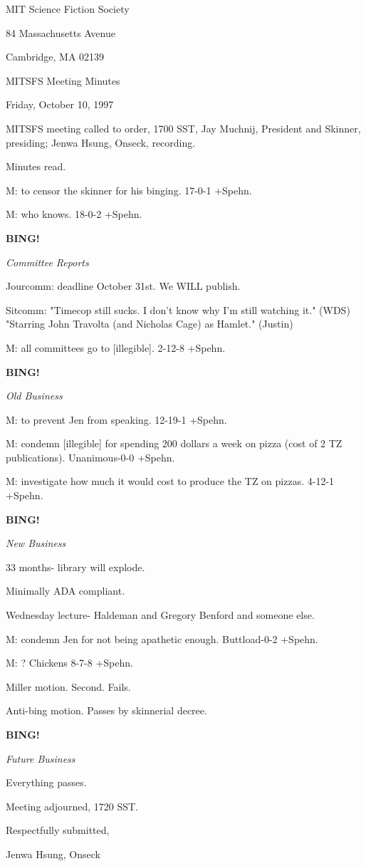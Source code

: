 \documentclass[12pt]{article}
\newcommand{\bing}{{\bf BING!} }
\newcommand{\goto}[1]{\bing \vskip 12pt \centerline{{\em{#1}}}}
\begin{document}
\begin{center}

MIT Science Fiction Society 

84 Massachusetts Avenue

Cambridge, MA 02139

\vspace{12pt}

MITSFS Meeting Minutes 

Friday, October 10, 1997

\end{center}
 
\vspace{18pt}

\setlength{\parskip}{6pt}

\noindent
MITSFS meeting called to order, 1700 SST,
Jay Muchnij, President and Skinner, presiding; Jenwa Hsung, Onseck, recording.

Minutes read.

M: to censor the skinner for his binging. 17-0-1 +Spehn.

M: who knows. 18-0-2 +Spehn.

\goto{Committee Reports}

Jourcomm: deadline October 31st. We WILL publish.

Sitcomm: "Timecop still sucks. I don't know why I'm still watching it." (WDS) "Starring John Travolta (and Nicholas Cage) as Hamlet." (Justin)

M: all committees go to [illegible]. 2-12-8 +Spehn.

\goto{Old Business}

M: to prevent Jen from speaking. 12-19-1 +Spehn.

M: condemn [illegible] for spending 200 dollars a week on pizza (cost of 2 TZ publications). Unanimous-0-0 +Spehn.

M: investigate how much it would cost to produce the TZ on pizzas. 4-12-1 +Spehn.

\goto{New Business}

33 months- library will explode.

Minimally ADA compliant.

Wednesday lecture- Haldeman and Gregory Benford and someone else.

M: condemn Jen for not being apathetic enough. Buttload-0-2 +Spehn.

M: ? Chickens 8-7-8 +Spehn.

Miller motion. Second. Fails.

Anti-bing motion. Passes by skinnerial decree.

\goto{Future Business}

Everything passes.

\vspace{12pt}

\noindent
Meeting adjourned, 1720 SST.

\vspace{18pt}

\centerline{Respectfully submitted,}
\centerline{Jenwa Hsung, Onseck}
\end{document}
